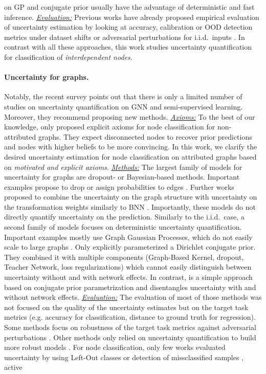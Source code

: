on GP and conjugate prior usually have the advantage of deterministic and fast inference. \emph{\underline{Evaluation:}} Previous works have already proposed empirical evaluation of uncertainty estimation by looking at accuracy, calibration or OOD detection metrics under dataset shifts or adversarial perturbations for i.i.d.\ inputs \citep{dataset-shift, robustness-uncertainty-dirichlet}. In contrast with all these approaches, this work studies uncertainty quantification for classification of \emph{interdependent nodes}.

\paragraph{Uncertainty for graphs.} Notably, the recent survey \citep{review-uncertainty-dl} points out that there is only a limited number of studies on uncertainty quantification on GNN and semi-supervised learning. Moreover, they recommend proposing new methods. \emph{\underline{Axioms:}} To the best of our knowledge, only \citep{Eswaran2017} proposed explicit axioms for node classification for non-attributed graphs. They expect disconnected nodes to recover prior predictions and nodes with higher beliefs to be more convincing. In this work, we clarify the desired uncertainty estimation for node classification on attributed graphs based on \emph{motivated and explicit axioms}. \emph{\underline{Methods:}} The largest family of models for uncertainty for graphs are dropout- or Bayesian-based methods. Important examples propose to drop or assign probabilities to edges \citep{Rong2019, Chen2018, Hasanzadeh2020, Dallachiesa2014, Hu2017}. Further works proposed to combine the uncertainty on the graph structure with uncertainty on the transformation weights similarly to BNN \citep{Elinas2019, Zhang2019b, Pal2019a, Pal2019b}. Importantly, these models do not directly quantify uncertainty on the prediction. Similarly to the i.i.d.\ case, a second family of models focuses on deterministic uncertainty quantification. Important examples mostly use Graph Gaussian Processes, which do not easily scale to large graphs \citep{Ng2018, Zhi2020, Liu2020c, Borovitskiy2020}. Only \citep{Zhao2020} explicitly parameterized a Dirichlet conjugate prior. They combined it with multiple components (Graph-Based Kernel, dropout, Teacher Network, loss regularizations) which cannot easily distinguish between uncertainty without and with network effects. In contrast, \GPNacro{} is a simple approach based on conjugate prior parametrization and disentangles uncertainty with and without network effects. \emph{\underline{Evaluation:}} The evaluation of most of those methods was not focused on the quality of the uncertainty estimates but on the target task metrics (e.g. accuracy for classification, distance to ground truth for regression). Some methods focus on robustness of the target task metrics against adversarial perturbations \citep{GNNBook-ch8-gunnemann, zugner2018adversarial, zugner2019adversarial}. Other methods only relied on uncertainty quantification to build more robust models \citep{Zhu2019, Feng2020}. For node classification, only few works evaluated uncertainty by using Left-Out classes or detection of missclassified samples \citep{Zhao2020}, active 